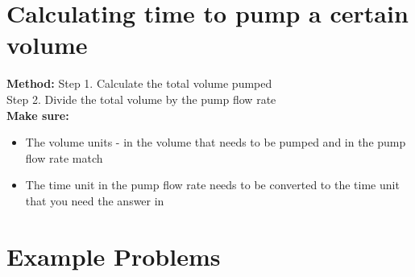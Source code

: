 \section{Calculating time to pump a certain volume}
\textbf{Method:}
\hspace{1cm}Step 1. Calculate the total volume pumped\\
\hspace{1cm}Step 2.	Divide the total volume by the pump flow rate\\
\textbf{Make sure:}
\begin{itemize}
\item The volume units - in the volume that needs to be pumped and in the pump flow rate match
\item The time unit in the pump flow rate needs to be converted to the time unit that you need the answer in
\end{itemize}

\section{Example Problems}

